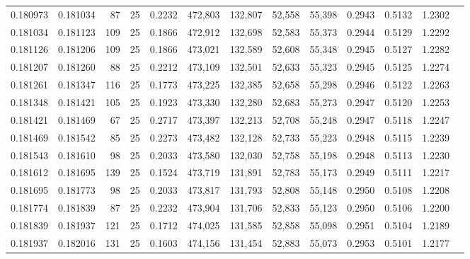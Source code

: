 \begin{tabular}{rrrrrrrrrrrrr}
0.180973 & 0.181034 &    87 &  25 &                                     0.2232 & 472,803 & 132,807 &  52,558 &  55,398 & 0.2943 & 0.5132 & 1.2302 \\
0.181034 & 0.181123 &   109 &  25 &                                     0.1866 & 472,912 & 132,698 &  52,583 &  55,373 & 0.2944 & 0.5129 & 1.2292 \\
0.181126 & 0.181206 &   109 &  25 &                                     0.1866 & 473,021 & 132,589 &  52,608 &  55,348 & 0.2945 & 0.5127 & 1.2282 \\
0.181207 & 0.181260 &    88 &  25 &                                     0.2212 & 473,109 & 132,501 &  52,633 &  55,323 & 0.2945 & 0.5125 & 1.2274 \\
0.181261 & 0.181347 &   116 &  25 &                                     0.1773 & 473,225 & 132,385 &  52,658 &  55,298 & 0.2946 & 0.5122 & 1.2263 \\
0.181348 & 0.181421 &   105 &  25 &                                     0.1923 & 473,330 & 132,280 &  52,683 &  55,273 & 0.2947 & 0.5120 & 1.2253 \\
0.181421 & 0.181469 &    67 &  25 &                                     0.2717 & 473,397 & 132,213 &  52,708 &  55,248 & 0.2947 & 0.5118 & 1.2247 \\
0.181469 & 0.181542 &    85 &  25 &                                     0.2273 & 473,482 & 132,128 &  52,733 &  55,223 & 0.2948 & 0.5115 & 1.2239 \\
0.181543 & 0.181610 &    98 &  25 &                                     0.2033 & 473,580 & 132,030 &  52,758 &  55,198 & 0.2948 & 0.5113 & 1.2230 \\
0.181612 & 0.181695 &   139 &  25 &                                     0.1524 & 473,719 & 131,891 &  52,783 &  55,173 & 0.2949 & 0.5111 & 1.2217 \\
0.181695 & 0.181773 &    98 &  25 &                                     0.2033 & 473,817 & 131,793 &  52,808 &  55,148 & 0.2950 & 0.5108 & 1.2208 \\
0.181774 & 0.181839 &    87 &  25 &                                     0.2232 & 473,904 & 131,706 &  52,833 &  55,123 & 0.2950 & 0.5106 & 1.2200 \\
0.181839 & 0.181937 &   121 &  25 &                                     0.1712 & 474,025 & 131,585 &  52,858 &  55,098 & 0.2951 & 0.5104 & 1.2189 \\
0.181937 & 0.182016 &   131 &  25 &                                     0.1603 & 474,156 & 131,454 &  52,883 &  55,073 & 0.2953 & 0.5101 & 1.2177 \\

\end{tabular}
